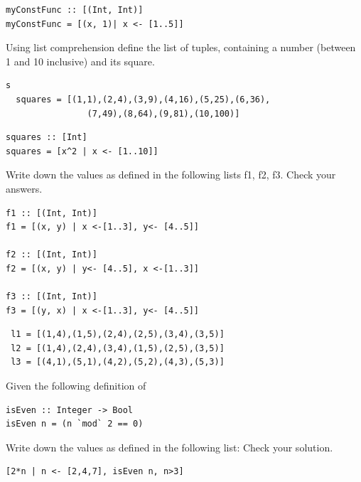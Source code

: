 \documentclass{article}
\begin{document}
\begin{solution}
\begin{lstlisting}
myConstFunc :: [(Int, Int)]
myConstFunc = [(x, 1)| x <- [1..5]]
\end{lstlisting}
\end{solution}
\begin{exercise}
Using list comprehension define the list of tuples, containing a number (between 1 and 10 inclusive)  and its square. 
\begin{lstlisting}s
  squares = [(1,1),(2,4),(3,9),(4,16),(5,25),(6,36),
                (7,49),(8,64),(9,81),(10,100)]
\end{lstlisting}
\end{exercise}
\begin{solution}
\begin{lstlisting}
squares :: [Int]
squares = [x^2 | x <- [1..10]]
\end{lstlisting}
\end{solution}

\pagebreak
\begin{exercise}
Write down the values as defined in the following lists f1, f2, f3. Check your answers. 
\begin{lstlisting}
f1 :: [(Int, Int)]
f1 = [(x, y) | x <-[1..3], y<- [4..5]]

f2 :: [(Int, Int)]
f2 = [(x, y) | y<- [4..5], x <-[1..3]]

f3 :: [(Int, Int)]
f3 = [(y, x) | x <-[1..3], y<- [4..5]]
\end{lstlisting}
\end{exercise}

\begin{solution}
\begin{lstlisting}
 l1 = [(1,4),(1,5),(2,4),(2,5),(3,4),(3,5)]
 l2 = [(1,4),(2,4),(3,4),(1,5),(2,5),(3,5)]
 l3 = [(4,1),(5,1),(4,2),(5,2),(4,3),(5,3)]
\end{lstlisting}
\end{solution}
\begin{exercise}
Given the following definition of 
\begin{lstlisting}
isEven :: Integer -> Bool
isEven n = (n `mod` 2 == 0)
\end{lstlisting}
Write down the values as defined in the following list: Check your solution. 
\begin{lstlisting}
[2*n | n <- [2,4,7], isEven n, n>3]
\end{lstlisting}
\end{exercise}
\end{document}
